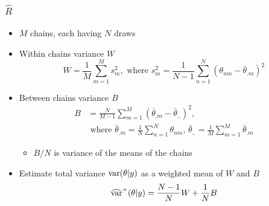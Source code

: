 \documentclass[10pt]{beamer}
\begin{document}
\begin{frame}

\frametitle{ $\widehat{R}$}

  \begin{itemize}
  \item $M$ chains, each having $N$ draws
  \item<2-> Within chains variance $W$
    \begin{equation*}
      W=\frac{1}{M}\sum_{m=1}^M s^2_m ,\text{ where }
      s^2_m=\frac{1}{N-1}\sum_{n=1}^N (\theta_{nm}-\bar{\theta}_{.m})^2
    \end{equation*}
  \item<3-> Between chains variance $B$
    \begin{align*}
      B&=\frac{N}{M-1}\sum_{m=1}^M
      (\bar{\theta}_{.m}-\bar{\theta}_{..})^2,\\
      &\text{ where } \bar{\theta}_{.m}=\frac{1}{N}\sum_{n=1}^N \theta_{nm}, \,
      \bar{\theta}_{..}=\frac{1}{M}\sum_{m=1}^M\bar{\theta}_{.m}
    \end{align*}
    \begin{itemize}
      \item<4-> $B/N$ is variance of the means of the chains
    \end{itemize}
    \vspace{2mm}
  \item<5-> Estimate total variance
    $\mathrm{var}(\theta|y)$ as a weighted mean of $W$ and $B$
    \begin{equation*}
      \widehat{\mathrm{var}}^{+}(\theta|y) = \frac{N-1}{N}W+\frac{1}{N}B
    \end{equation*}
  \end{itemize}

\end{frame}
\end{document}
